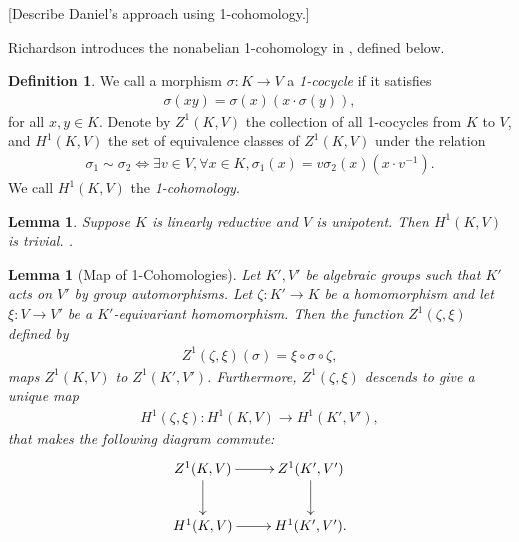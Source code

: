 \documentclass[12pt]{amsart}
\numberwithin{equation}{section}
\newtheorem{lem}[equation]{Lemma}
\theoremstyle{definition}
\newtheorem{defn}[equation]{Definition}
\theoremstyle{remark}
\theoremstyle{remark}
\begin{document}
[Describe Daniel's approach using 1-cohomology.]

Richardson introduces the nonabelian 1-cohomology in \cite{richardson1982orbits}, defined below.

\begin{defn} We call a morphism $\sigma:K\rightarrow V$ a \emph{1-cocycle} if it satisfies
\begin{align*}
  \sigma(xy) = \sigma(x) (x\cdot\sigma(y)),
  \label{eqn:na_z}
\end{align*}
for all $x, y \in K$. Denote by $Z^1\left( K, V \right)$ the collection of all 1-cocycles from $K$ to $V$, and $H^1(K, V)$ the set of equivalence classes of $Z^1(K, V)$ under the relation
\begin{align*}
\sigma_1 \sim \sigma_2 \Leftrightarrow \exists v \in V,\forall x \in K, \sigma_1(x) = v\sigma_2(x)(x \cdot v^{-1}).
\end{align*}
We call $H^1(K, V)$ the \emph{1-cohomology}.
\end{defn}

\begin{lem}
  Suppose $K$ is linearly reductive and $V$ is unipotent. Then $H^1(K, V)$ is trivial. \cite[Lemma 6.2.6]{richardson1982orbits}.
  \label{lem:nonab_lin_red}
\end{lem}

\begin{lem}[Map of 1-Cohomologies] \label{h1maps} Let $K', V'$ be algebraic groups such that $K'$ acts on $V'$ by group automorphisms.
	Let $\zeta:K' \rightarrow K$ be a homomorphism and let $\xi: V \rightarrow V'$ be a $K'$-equivariant homomorphism.
	Then the function $Z^1(\zeta, \xi)$ defined by
	\begin{align*}
		Z^1(\zeta, \xi)(\sigma) = \xi \circ \sigma \circ \zeta,
	\end{align*}
	maps $Z^1(K, V)$ to $Z^1(K', V')$. Furthermore, $Z^1(\zeta, \xi)$ descends to give a unique map
	\begin{align*}
	H^1(\zeta, \xi):H^1(K,V)\rightarrow H^1(K',V'),
	\end{align*}
	that makes the following diagram commute:
	\begin{align*}
		\xymatrix{
			Z^1(K, V) \ar[r] \ar[d] & Z^1(K', V') \ar[d] \\
			H^1(K, V) \ar[r]        & H^1(K', V').
		}
	\end{align*}
\end{lem}
\end{document}
